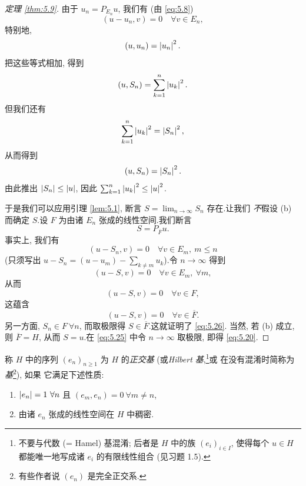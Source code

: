 \begin{proof}[定理 \ref{thm:5.9}]
由于 $u_n=P_{E_n}u$, 我们有 (由 \eqref{eq:5.8})
\begin{equation}
(u-u_n,v)=0\quad\forall v\in E_n,
\label{eq:5.24}
\end{equation}
特别地,
\begin{equation*}
(u,u_n)=\left|u_n\right|^2.
\end{equation*}
把这些等式相加, 得到
\begin{equation*}
(u,S_n)=\sum_{k=1}^n\left|u_k\right|^2.
\end{equation*}
但我们还有
\begin{equation}
\sum_{k=1}^n\left|u_k\right|^2=\left|S_n\right|^2,
\label{eq:5.25}
\end{equation}
从而得到
\begin{equation*}
(u,S_n)=\left|S_n\right|^2.
\end{equation*}
由此推出 $\left|S_n\right|\le\left|u\right|$, 因此 $\sum_{k=1}^n\left|u_k\right|^2\le\left|u\right|^2$.

于是我们可以应用引理  \ref{lem:5.1}, 断言 $S=\lim_{n\to\infty}S_n$ 存在.让我们
\emph{不}假设 (b) 而确定 $S$.设 $F$ 为由诸 $E_n$ 张成的线性空间.我们断言
\begin{equation}
S=P_{\overline{F}}u.
\label{eq:5.26}
\end{equation}
事实上, 我们有
\begin{equation*}
(u-S_n,v)=0\quad\forall v\in E_m,\ m\le n
\end{equation*}
(只须写出 $u-S_n=(u-u_m)-\sum_{k\ne m}u_k$).令 $n\to\infty$ 得到
\begin{equation*}
(u-S,v)=0\quad\forall v\in E_m,\ \forall m,
\end{equation*}
从而
\begin{equation*}
(u-S,v)=0\quad\forall v\in F,
\end{equation*}
这蕴含
\begin{equation*}
(u-S,v)=0\quad\forall v\in\overline{F}.
\end{equation*}
另一方面, $S_n\in F\ \forall n$, 而取极限得 $S\in\overline{F}$.这就证明了 \eqref{eq:5.26}.
当然, 若 (b) 成立, 则 $\overline{F}=H$, 从而 $S=u$.在 \eqref{eq:5.25} 中令
$n\to\infty$ 取极限, 即得 \eqref{eq:5.20}.
\end{proof}

\begin{definition}
称 $H$ 中的序列 $(e_n)_{n\ge1}$ 为 $H$ 的\emph{正交基} (或\emph{Hilbert
基},\footnote{不要与代数 (= Hamel) 基混淆; 后者是 $H$ 中的族 $(e_i)_{i\in I}$,
使得每个 $u\in H$ 都能唯一地写成诸 $e_i$ 的有限线性组合 (见习题 1.5).}或
在没有混淆时简称为\emph{基}\footnote{有些作者说 $(e_n)$ 是完全正交系.}), 如果
它满足下述性质:
\begin{enumerate}[label=(\roman*), leftmargin=2.6em, itemsep=0.2em]
	\item $\left|e_n\right|=1\ \forall n$ 且 $(e_m,e_n)=0\ \forall m\ne n$,
	\item 由诸 $e_n$ 张成的线性空间在 $H$ 中稠密.
\end{enumerate}
\end{definition}

